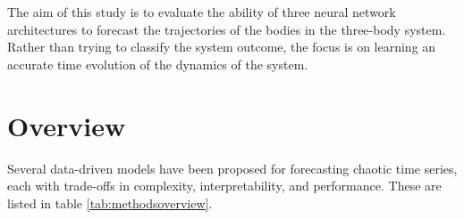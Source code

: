 \documentclass[%
 reprint,
 amsmath,amssymb,
 aps,
]{revtex4-2}
\begin{document}
The aim of this study is to evaluate the ability of three neural network architectures to forecast the trajectories of the bodies in the three-body system. Rather than trying to classify the system outcome, the focus is on learning an accurate time evolution of the dynamics of the system.

\section{\label{sec:overview}Overview} %

Several data-driven models have been proposed for forecasting chaotic time series, each with trade-offs in complexity, interpretability, and performance. These are listed in table \ref{tab:methodsoverview}.
\end{document}
